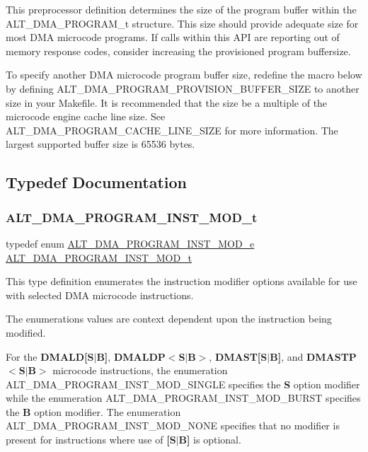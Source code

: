 This preprocessor definition determines the size of the program buffer within the A\+L\+T\+\_\+\+D\+M\+A\+\_\+\+P\+R\+O\+G\+R\+A\+M\+\_\+t structure. This size should provide adequate size for most D\+MA microcode programs. If calls within this A\+PI are reporting out of memory response codes, consider increasing the provisioned program buffersize.

To specify another D\+MA microcode program buffer size, redefine the macro below by defining A\+L\+T\+\_\+\+D\+M\+A\+\_\+\+P\+R\+O\+G\+R\+A\+M\+\_\+\+P\+R\+O\+V\+I\+S\+I\+O\+N\+\_\+\+B\+U\+F\+F\+E\+R\+\_\+\+S\+I\+ZE to another size in your Makefile. It is recommended that the size be a multiple of the microcode engine cache line size. See A\+L\+T\+\_\+\+D\+M\+A\+\_\+\+P\+R\+O\+G\+R\+A\+M\+\_\+\+C\+A\+C\+H\+E\+\_\+\+L\+I\+N\+E\+\_\+\+S\+I\+ZE for more information. The largest supported buffer size is 65536 bytes. 

\subsection{Typedef Documentation}
\mbox{\label{group__ALT__DMA__PRG_gaf8145a0ef11f4188f07bb0c961575d4a}} 
\subsubsection{\texorpdfstring{ALT\_DMA\_PROGRAM\_INST\_MOD\_t}{ALT\_DMA\_PROGRAM\_INST\_MOD\_t}}
{\footnotesize\ttfamily typedef enum \mbox{\hyperlink{group__ALT__DMA__PRG_ga6b384475142e2b8bedeb93223c460229}{A\+L\+T\+\_\+\+D\+M\+A\+\_\+\+P\+R\+O\+G\+R\+A\+M\+\_\+\+I\+N\+S\+T\+\_\+\+M\+O\+D\+\_\+e}}
 \mbox{\hyperlink{group__ALT__DMA__PRG_gaf8145a0ef11f4188f07bb0c961575d4a}{A\+L\+T\+\_\+\+D\+M\+A\+\_\+\+P\+R\+O\+G\+R\+A\+M\+\_\+\+I\+N\+S\+T\+\_\+\+M\+O\+D\+\_\+t}}}

This type definition enumerates the instruction modifier options available for use with selected D\+MA microcode instructions.

The enumerations values are context dependent upon the instruction being modified.

For the {\bfseries{D\+M\+A\+LD\mbox{[}S$\vert$B\mbox{]}}}, {\bfseries{D\+M\+A\+L\+DP$<$S$\vert$B$>$}}, {\bfseries{D\+M\+A\+ST\mbox{[}S$\vert$B\mbox{]}}}, and {\bfseries{D\+M\+A\+S\+TP$<$S$\vert$B$>$}} microcode instructions, the enumeration A\+L\+T\+\_\+\+D\+M\+A\+\_\+\+P\+R\+O\+G\+R\+A\+M\+\_\+\+I\+N\+S\+T\+\_\+\+M\+O\+D\+\_\+\+S\+I\+N\+G\+LE specifies the {\bfseries{S}} option modifier while the enumeration A\+L\+T\+\_\+\+D\+M\+A\+\_\+\+P\+R\+O\+G\+R\+A\+M\+\_\+\+I\+N\+S\+T\+\_\+\+M\+O\+D\+\_\+\+B\+U\+R\+ST specifies the {\bfseries{B}} option modifier. The enumeration A\+L\+T\+\_\+\+D\+M\+A\+\_\+\+P\+R\+O\+G\+R\+A\+M\+\_\+\+I\+N\+S\+T\+\_\+\+M\+O\+D\+\_\+\+N\+O\+NE specifies that no modifier is present for instructions where use of {\bfseries{\mbox{[}S$\vert$B\mbox{]}}} is optional.

